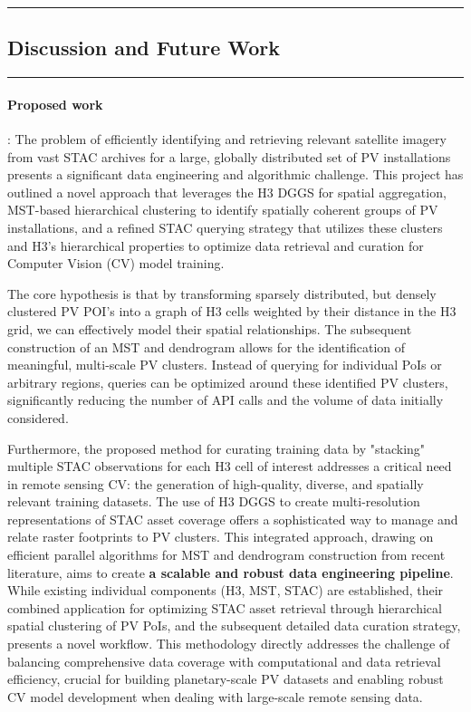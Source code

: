 {\color{gray}\hrule}
\begin{center}
\section{Discussion and Future Work}
\bigskip
\end{center}
{\color{gray}\hrule}
\vspace{0.5cm}

\paragraph{Proposed work}: The problem of efficiently identifying and retrieving relevant satellite imagery from vast STAC archives for a large, globally distributed set of PV installations presents a significant data engineering and algorithmic challenge. 
This project has outlined a novel approach that leverages the H3 DGGS for spatial aggregation, MST-based hierarchical clustering to identify spatially coherent groups of PV installations, and a refined 
STAC querying strategy that utilizes these clusters and H3's hierarchical properties to optimize data retrieval and curation for Computer Vision (CV) model training. 

The core hypothesis is that by transforming sparsely distributed, but densely clustered PV POI's into a graph of H3 cells weighted by their distance in the H3 grid, we can effectively model their spatial relationships. 
The subsequent construction of an MST and dendrogram allows for the identification of meaningful, multi-scale PV clusters. 
Instead of querying for individual PoIs or arbitrary regions, queries can be optimized around these identified PV clusters, significantly reducing the number of API calls and the volume of data initially considered.

Furthermore, the proposed method for curating training data by "stacking" multiple STAC observations for each H3 cell of interest addresses a critical need in remote sensing CV: the generation of high-quality, diverse, and spatially relevant training datasets. 
The use of H3 DGGS to create multi-resolution representations of STAC asset coverage offers a sophisticated way to manage and relate raster footprints to PV clusters. 
This integrated approach, drawing on efficient parallel algorithms for MST and dendrogram construction from recent literature, aims to create \textbf{a scalable and robust data engineering pipeline}.
While existing individual components (H3, MST, STAC) are established, their combined application for optimizing STAC asset retrieval through hierarchical spatial clustering of PV PoIs, and the subsequent detailed data curation strategy, presents a novel workflow. 
This methodology directly addresses the challenge of balancing comprehensive data coverage with computational and data retrieval efficiency, crucial for building planetary-scale PV datasets and enabling robust CV model development when dealing with large-scale remote sensing data.

